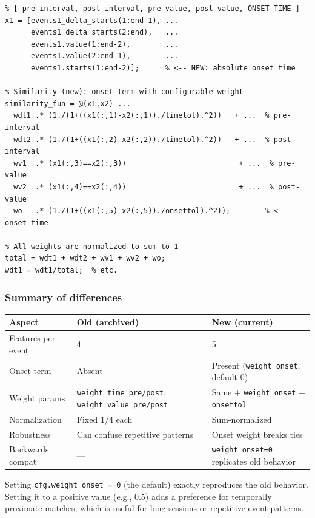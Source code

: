 \documentclass[11pt, a4paper]{article}
\begin{document}
\begin{lstlisting}[style=matlab, caption={New 5-feature similarity (current)}]
% Feature vector for event i (5 features):
% [ pre-interval, post-interval, pre-value, post-value, ONSET TIME ]
x1 = [events1_delta_starts(1:end-1), ...
      events1_delta_starts(2:end),   ...
      events1.value(1:end-2),        ...
      events1.value(2:end-1),        ...
      events1.starts(1:end-2)];      % <-- NEW: absolute onset time

% Similarity (new): onset term with configurable weight
similarity_fun = @(x1,x2) ...
  wdt1 .* (1./(1+((x1(:,1)-x2(:,1))./timetol).^2))   + ...  % pre-interval
  wdt2 .* (1./(1+((x1(:,2)-x2(:,2))./timetol).^2))   + ...  % post-interval
  wv1  .* (x1(:,3)==x2(:,3))                          + ...  % pre-value
  wv2  .* (x1(:,4)==x2(:,4))                          + ...  % post-value
  wo   .* (1./(1+((x1(:,5)-x2(:,5))./onsettol).^2));        % <-- onset time

% All weights are normalized to sum to 1
total = wdt1 + wdt2 + wv1 + wv2 + wo;
wdt1 = wdt1/total;  % etc.
\end{lstlisting}

\subsubsection{Summary of differences}

\begin{center}
\begin{tabular}{L{4.5cm} L{4.5cm} L{4.5cm}}
\toprule
\textbf{Aspect} & \textbf{Old (archived)} & \textbf{New (current)} \\
\midrule
Features per event & 4 & 5 \\
Onset term & Absent & Present (\texttt{weight\_onset}, default 0) \\
Weight params & \texttt{weight\_time\_pre/post}, \texttt{weight\_value\_pre/post} & Same + \texttt{weight\_onset} + \texttt{onsettol} \\
Normalization & Fixed 1/4 each & Sum-normalized \\
Robustness & Can confuse repetitive patterns & Onset weight breaks ties \\
Backwards compat & --- & \texttt{weight\_onset=0} replicates old behavior \\
\bottomrule
\end{tabular}
\end{center}

Setting \texttt{cfg.weight\_onset = 0} (the default) exactly reproduces the old behavior. Setting it to a positive value (e.g., 0.5) adds a preference for temporally proximate matches, which is useful for long sessions or repetitive event patterns.
\end{document}
